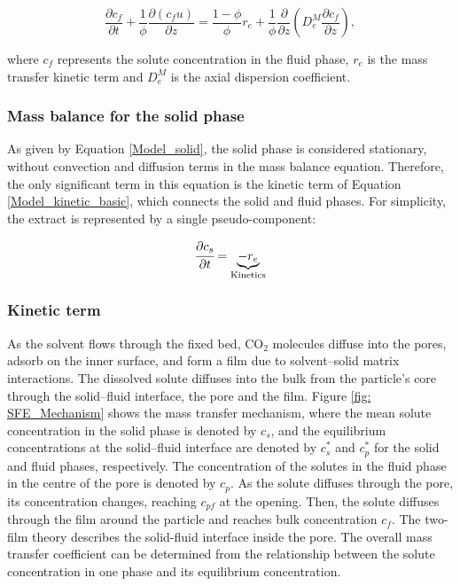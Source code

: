 \documentclass[a4paper,fleqn]{cas-dc}
\begin{document}
	{\footnotesize
		\begin{equation}
			\label{Model_fluid}
			\frac{\partial c_f}{\partial t}
			+ \frac{1}{\phi} \frac{\partial \left( c_f u\right)}{\partial z}
			= \frac{1-\phi}{\phi} r_e
			+ \frac{1}{\phi} \frac{\partial}{\partial z} \left( D^M_e \frac{\partial c_f}{\partial z} \right),
		\end{equation}
	}
	
	where $c_f$ represents the solute concentration in the fluid phase, $r_e$ is the mass transfer kinetic term and $D^M_e$ is the axial dispersion coefficient.
	
	\subsubsection{Mass balance for the solid phase} \label{Mass_balance_solid}
	
	As given by Equation \ref{Model_solid}, the solid phase is considered stationary, without convection and diffusion terms in the mass balance equation. Therefore, the only significant term in this equation is the kinetic term of Equation \ref{Model_kinetic_basic}, which connects the solid and fluid phases. For simplicity, the extract is represented by a single pseudo-component: 
	
	{\footnotesize
		\begin{equation} 
			\label{Model_solid}
			\cfrac{\partial c_s}{\partial t} = \underbrace{-r_e}_{\text{Kinetics}}
	\end{equation} }
	
	\subsubsection{Kinetic term} \label{CH: Kinetic}
	
	As the solvent flows through the fixed bed, CO$_2$ molecules diffuse into the pores, adsorb on the inner surface, and form a film due to solvent--solid matrix interactions. The dissolved solute diffuses into the bulk from the particle's core through the solid--fluid interface, the pore and the film. Figure \ref{fig: SFE_Mechanism} shows the mass transfer mechanism, where the mean solute concentration in the solid phase is denoted by $c_s$, and the equilibrium concentrations at the solid--fluid interface are denoted by $c_s^*$ and $c_p^*$ for the solid and fluid phases, respectively. The concentration of the solutes in the fluid phase in the centre of the pore is denoted by $c_p$. As the solute diffuses through the pore, its concentration changes, reaching $c_{pf}$ at the opening. Then, the solute diffuses through the film around the particle and reaches bulk concentration $c_f$. The two-film theory describes the solid-fluid interface inside the pore. The overall mass transfer coefficient can be determined from the relationship between the solute concentration in one phase and its equilibrium concentration.
	
\end{document}
